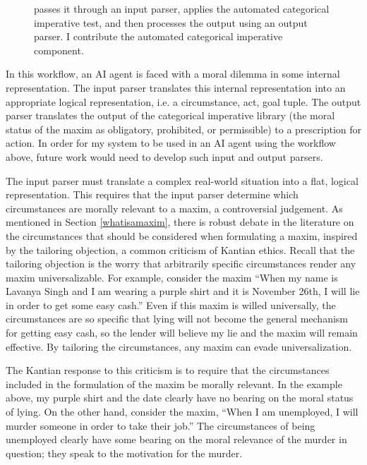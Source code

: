 \begin{isabellebody}
\begin{center}
\begin{figure}
{passes it through an input parser, applies the automated categorical imperative test, and then processes the 
output using an output parser. I contribute the automated categorical imperative component.} \label{fig:AIengine}
\end{figure}
\end{center}
%
\begin{isamarkuptext}%
In this workflow, an AI agent is faced with a moral dilemma in some internal representation. The input
parser translates this internal representation into an appropriate logical representation, i.e. 
a circumstance, act, goal tuple. The output parser translates the output of the categorical imperative
library (the moral status of the maxim as obligatory, prohibited, or permissible) to a prescription for
action. In order for my system to be used in an AI agent using the workflow
above, future work would need to develop such input and output parsers.

The input parser must translate a complex real-world situation into a flat, logical representation.
This requires that the input parser determine which circumstances are morally relevant
to a maxim, a controversial judgement. As mentioned in Section \ref{whatisamaxim},
there is robust debate in the literature on the circumstances that should be considered when formulating a maxim, 
inspired by the tailoring objection, a common criticism of Kantian ethics. Recall that the tailoring objection is the worry that arbitrarily specific 
circumstances render any maxim universalizable. For example, consider the maxim ``When my name is Lavanya Singh 
and I am wearing a purple shirt and it is November 26th, I will lie in order to get some easy cash.'' 
Even if this maxim is willed universally, the circumstances are so 
specific that lying will not become the general mechanism for getting easy cash, so the lender will 
believe my lie and the maxim will remain effective. By tailoring the circumstances, any maxim can 
evade universalization.

The Kantian response to this criticism is to require that the circumstances included in the formulation
of the maxim be morally relevant. In the example above, my purple shirt and the date clearly have no bearing on 
the moral status of lying. On the other hand, consider the maxim, ``When I am unemployed, I will murder
someone in order to take their job.'' The circumstances of being unemployed clearly have some bearing on the moral
relevance of the murder in question; they speak to the motivation for the murder. 


\end{isamarkuptext}
\end{isabellebody}
